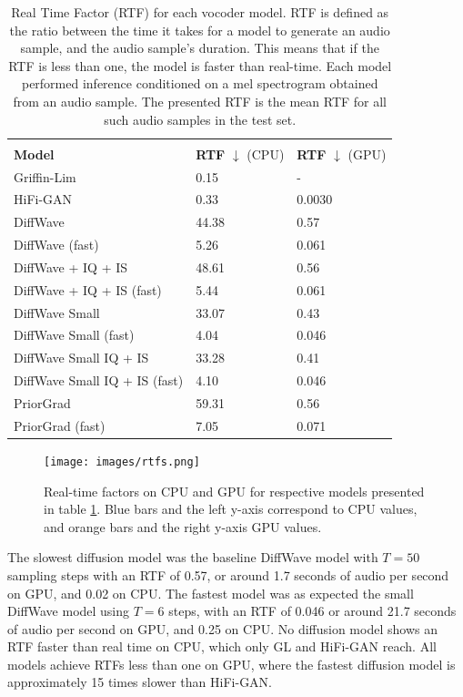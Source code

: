 \documentclass{report}
\begin{document}
\begin{table}[H]
\centering
\def\arraystretch{1.3}
\begin{tabular}{l l l}
 \hline\hline
 \vspace{-0.5cm} \\
 \textbf{Model} & \textbf{RTF} $\downarrow$ (CPU) & \textbf{RTF} $\downarrow$ (GPU) \\ [0.5ex]
 \hline
 Griffin-Lim & 0.15 & - \\
 \hline
 HiFi-GAN & 0.33 & 0.0030 \\
 \hline
 \hline
 DiffWave & 44.38 & 0.57 \\
 \hline
 DiffWave (fast) & 5.26 & 0.061 \\
 \hline
 DiffWave + IQ + IS & 48.61 & 0.56 \\
 \hline
 DiffWave + IQ + IS (fast) & 5.44 & 0.061 \\
 \hline
 DiffWave Small & 33.07 & 0.43 \\
 \hline
 DiffWave Small (fast) & 4.04 & 0.046 \\
\hline
 DiffWave Small IQ + IS & 33.28 & 0.41 \\
\hline
DiffWave Small IQ + IS (fast) & 4.10 & 0.046 \\
 \hline
 PriorGrad & 59.31 & 0.56 \\
 \hline
 PriorGrad (fast) & 7.05 & 0.071 \\
 \hline\hline
\end{tabular}
\caption{\onehalfspacing Real Time Factor (RTF) for each vocoder model. RTF is defined as the ratio between the time it takes for a model to generate an audio sample, and the audio sample's duration. This means that if the RTF is less than one, the model is faster than real-time. Each model performed inference conditioned on a mel spectrogram obtained from an audio sample. The presented RTF is the mean RTF for all such audio samples in the test set.}
\label{table:rtf}
\end{table}

\begin{figure}[H]
    \centering
    \texttt{[image: images/rtfs.png]}
    \caption{\onehalfspacing Real-time factors on CPU and GPU for respective models presented in table \ref{table:rtf}. Blue bars and the left y-axis correspond to CPU values, and orange bars and the right y-axis GPU values.}
    \label{fig:rtfs}
\end{figure}

The slowest diffusion model was the baseline DiffWave model with $T=50$ sampling steps with an RTF of 0.57, or around 1.7 seconds of audio per second on GPU, and 0.02 on CPU. The fastest model was as expected the small DiffWave model using $T=6$ steps, with an RTF of 0.046 or around 21.7 seconds of audio per second on GPU, and 0.25 on CPU. No diffusion model shows an RTF faster than real time on CPU, which only GL and HiFi-GAN reach. All models achieve RTFs less than one on GPU, where the fastest diffusion model is approximately 15 times slower than HiFi-GAN.
\end{document}
